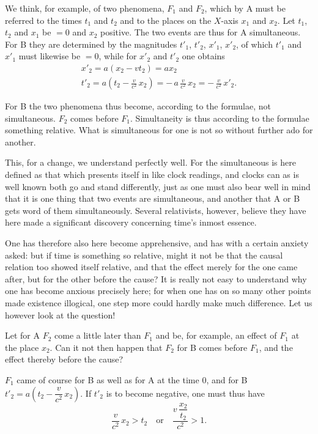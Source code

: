 \documentclass[12pt,a4paper]{article}
\begin{document}
We think, for example, of two phenomena, $F_{1}$ and $F_{2}$, which by A must
be referred to the times $t_{1}$ and $t_{2}$ and to the places on the $X$-axis
$x_{1}$ and $x_{2}$. Let $t_{1}$, $t_{2}$ and $x_{1}$ be $= 0$ and $x_{2}$
positive. The two events are thus for A simultaneous. For B they are
determined by the magnitudes $t'_{1}$, $t'_{2}$, $x'_{1}$, $x'_{2}$, of which
$t'_{1}$ and $x'_{1}$ must likewise be $= 0$, while for $x'_{2}$ and $t'_{2}$
one obtains
\begin{gather*}
  x'_{2} = a(x_{2} - vt_{2}) = ax_{2}\\
  t'_{2} = a\left(t_{2} - \frac{v}{c^{2}}\,x_{2}\right)
         = -\,a\,\frac{v}{c^{2}}\,x_{2}
         = -\,\frac{v}{c^{2}}\,x'_{2}.
\end{gather*}

For B the two phenomena thus become, according to the formulae, not
simultaneous. $F_{2}$ comes before $F_{1}$. Simultaneity is thus according to
the formulae something relative. What is simultaneous for one is not so
without further ado for another.

This, for a change, we understand perfectly well. For the simultaneous is here
defined as that which presents itself in like clock readings, and clocks can
as is well known both go and stand differently, just as one must also bear
well in mind that it is one thing that two events are simultaneous, and
another that A or B gets word of them simultaneously. Several relativists,
however, believe they have here made a significant discovery concerning time's
inmost essence.

One has therefore also here become apprehensive, and has with a certain
anxiety asked: but if time is something so relative, might it not be that the
causal relation too showed itself relative, and that the effect merely for the
one came after, but for the other before the cause? It is really not easy to
understand why one has become anxious precisely here; for when one has on so
many other points made existence illogical, one step more could hardly make
much difference. Let us however look at the question!

Let for A $F_{2}$ come a little later than $F_{1}$ and be, for example, an
effect of $F_{1}$ at the place $x_{2}$. Can it not then happen that $F_{2}$
for B comes before $F_{1}$, and the effect thereby before the cause?

$F_{1}$ came of course for B as well as for A at the time 0, and for B
$t'_{2} = a\left(t_{2} - \dfrac{v}{c^{2}}\,x_{2}\right)$. If $t'_{2}$ is to
become negative, one must thus have
\[
  \frac{v}{c^{2}}\,x_{2} > t_{2} \quad \text{or} \quad
  \frac{v\,\dfrac{x_{2}}{t_{2}}}{c^{2}} > 1.
\]
\end{document}
